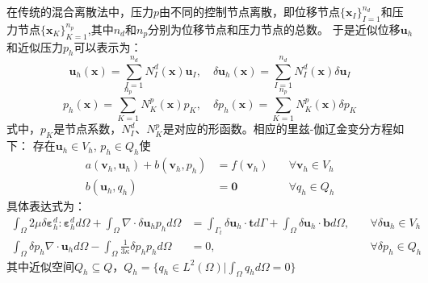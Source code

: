 在传统的混合离散法中，压力$p$由不同的控制节点离散，即位移节点$\{\boldsymbol x_I\}_{I=1}^{n_d}$和压力节点$\{\boldsymbol x_K\}_{K=1}^{n_p}$,其中$n_d$和$n_p$分别为位移节点和压力节点的总数。
于是近似位移$\boldsymbol u_h$和近似压力$p_h$可以表示为：
\begin{equation}\label{u_h_mix}
    \boldsymbol u_h(\boldsymbol x) = \sum_{I=1}^{n_d} N^d_I(\boldsymbol x) \boldsymbol u_I, \quad
    \delta \boldsymbol u_h(\boldsymbol x) = \sum_{I=1}^{n_d} N^d_I(\boldsymbol x) \delta \boldsymbol u_I
\end{equation}
\begin{equation}\label{p_h_mix}
    p_h(\boldsymbol x) = \sum_{K=1}^{n_p} N^p_K(\boldsymbol x) p_K, \quad
    \delta p_h(\boldsymbol x) = \sum_{K=1}^{n_p} N^p_K(\boldsymbol x) \delta p_K
\end{equation}
式中，$p_K$是节点系数，$N^d_I$、$N^p_K$是对应的形函数。相应的里兹-伽辽金变分方程如下：
存在$\boldsymbol u_h \in V_h$, $p_h \in Q_h$使
\begin{equation}
    \begin{aligned}
        a(\boldsymbol v_h, \boldsymbol u_h) + b(\boldsymbol v_h, p_h) &= f(\boldsymbol v_h) \quad &\forall \boldsymbol v_h \in V_h \\
        b(\boldsymbol u_h, q_h) &= \boldsymbol 0 \quad &\forall q_h \in Q_h
    \end{aligned}
\end{equation}
具体表达式为：
\begin{subequations}\label{ritz_mix}
\begin{alignat}{2}
\label{ritz_mix_1}
\int_\Omega 2\mu \delta \boldsymbol \varepsilon^d_h : \boldsymbol \varepsilon^d_h d\Omega +
\int_\Omega \nabla \cdot \delta \boldsymbol u_h p_h d\Omega &=
\int_{\Gamma_t} \delta \boldsymbol u_h \cdot \boldsymbol t d\Gamma + \int_\Omega \delta \boldsymbol u_h \cdot \boldsymbol b d\Omega, \quad
&\forall \delta \boldsymbol u_h \in V_h \\
\label{ritz_mix_2}
\int_\Omega \delta p_h \nabla \cdot \boldsymbol u_h d\Omega - \int_\Omega \frac{1}{3\kappa} \delta p_h p_h d\Omega &= 0, &\forall \delta p_h \in Q_h
\end{alignat}
\end{subequations}
其中近似空间$Q_h \subseteq Q$，$Q_h = \{q_h \in L^2(\Omega) \vert \int_{\Omega} q_h d\Omega = 0\}$


